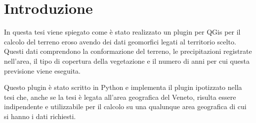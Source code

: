 
\cleardoublepage
{}

\chapter*{Introduzione}

In questa tesi viene spiegato come è stato realizzato un plugin per QGis per il calcolo del terreno eroso avendo dei dati geomorfici legati al territorio scelto. Questi dati comprendono la conformazione del terreno, le precipitazioni registrate nell'area, il tipo di copertura della vegetazione e il numero di anni per cui questa previsione viene eseguita.

Questo plugin è stato scritto in Python e implementa il plugin ipotizzato nella tesi \cite{tesi:ambientale} che, anche se la tesi è legata all'area geografica del Veneto, risulta essere indipendente e utilizzabile per il calcolo su una qualunque area geografica di cui si hanno i dati richiesti.
